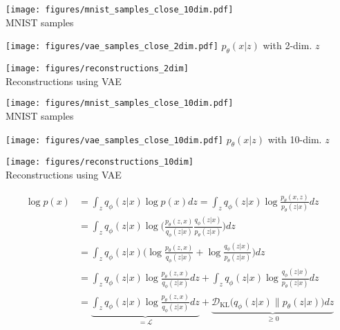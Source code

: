 \documentclass[11pt, a4paper, landscape]{article}
\begin{document}
\NewPage{}
\begin{minipage}[t]{.5\linewidth}
	\begin{center}
		\texttt{[image: figures/mnist\_samples\_close\_10dim.pdf]}\\
		MNIST samples
	\end{center}
\end{minipage}
\begin{minipage}[t]{.5\linewidth}
	\begin{center}
		\texttt{[image: figures/vae\_samples\_close\_2dim.pdf]}
		$p_\theta(x|z)$ with 2-dim. $z$
	\end{center}
\end{minipage}
	\begin{center}
		\texttt{[image: figures/reconstructions\_2dim]}\\
		Reconstructions using VAE
	\end{center}

\NewPage{}
\begin{minipage}[t]{.5\linewidth}
	\begin{center}
		\texttt{[image: figures/mnist\_samples\_close\_10dim.pdf]}\\
		MNIST samples
	\end{center}
\end{minipage}
\begin{minipage}[t]{.5\linewidth}
	\begin{center}
		\texttt{[image: figures/vae\_samples\_close\_10dim.pdf]}
		$p_\theta(x|z)$ with 10-dim. $z$
	\end{center}
\end{minipage}
	\begin{center}
		\texttt{[image: figures/reconstructions\_10dim]}\\
		Reconstructions using VAE
	\end{center}

\NewPage{}
\begin{align*}
	\log p(x) &= \int_z q_\phi(z|x) \log p(x) dz
	= \int_z q_\phi(z|x) \log \frac{p_\theta(x,z)}{p_\theta(z|x)} dz\\
	&= \int_z q_\phi(z|x) \log\bigg(\frac{p_\theta(z,x)}{q_\phi(z|x)} \frac{q_\phi(z|x)}{p_\theta(z|x)}\bigg) dz\\
	&= \int_z q_\phi(z|x) \bigg(\log\frac{p_\theta(z,x)}{q_\phi(z|x)} + \log\frac{q_\phi(z|x)}{p_\theta(z|x)}\bigg) dz\\
	&= \int_z q_\phi(z|x) \log \frac{p_\theta(z,x)}{q_\phi(z|x)} dz + \int_z q_\phi(z|x) \log\frac{q_\phi(z|x)}{p_\theta(z|x)} dz\\
	&= \underbrace{\int_z q_\phi(z|x) \log \frac{p_\theta(z,x)}{q_\phi(z|x)} dz}_{= \mathcal{L}}+ \underbrace{\mathcal{D}_{\mathrm{KL}}\big(q_\phi(z|x) \| p_\theta(z|x)\big) dz}_{\geq 0}\\
\end{align*}
\end{document}
